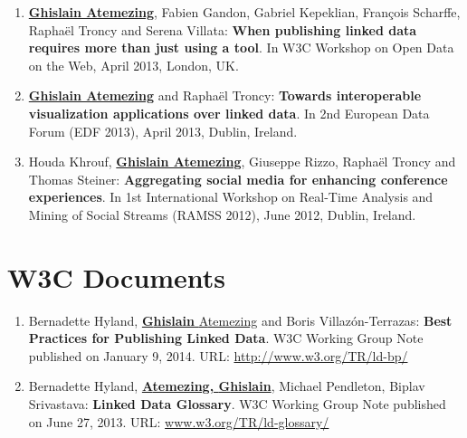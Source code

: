 \begin{enumerate}
 \item \underline{\textbf{Ghislain Atemezing}}, Fabien Gandon, Gabriel Kepeklian, Fran\c{c}ois Scharffe, Rapha{\"e}l Troncy and Serena Villata: \textbf{When publishing linked data requires more than just using a tool}. In W3C Workshop on Open Data on the Web, April 2013, London, UK.

 \item \underline{\textbf{Ghislain Atemezing}} and Rapha{\"e}l Troncy: \textbf{Towards interoperable visualization applications over linked data}. In 2nd European Data Forum (EDF 2013), April 2013, Dublin, Ireland.


 \item Houda Khrouf, \underline{\textbf{Ghislain Atemezing}}, Giuseppe Rizzo, Rapha\"{e}l Troncy and Thomas Steiner: \textbf{Aggregating social media for enhancing conference experiences}. In 1st International Workshop on Real-Time Analysis and Mining of Social Streams (RAMSS 2012), June 2012, Dublin, Ireland.

 

\end{enumerate}

\section*{W3C Documents}
\label{sec:w3cdocs}
\begin{enumerate}
 \item {B}ernadette {H}yland, \underline{\textbf{{G}hislain} {A}temezing} and {B}oris {V}illaz{\'o}n-{T}errazas: \textbf{Best Practices for Publishing Linked Data}. W3C Working Group Note published on January 9, 2014. URL: \url{http://www.w3.org/TR/ld-bp/}

 \item {B}ernadette {H}yland, \underline{\textbf{{A}temezing, {G}hislain}}, {M}ichael {P}endleton, {B}iplav {S}rivastava: \textbf{Linked Data Glossary}. W3C Working Group Note published on June 27, 2013. URL: \url{www.w3.org/TR/ld-glossary/}
\end{enumerate} 